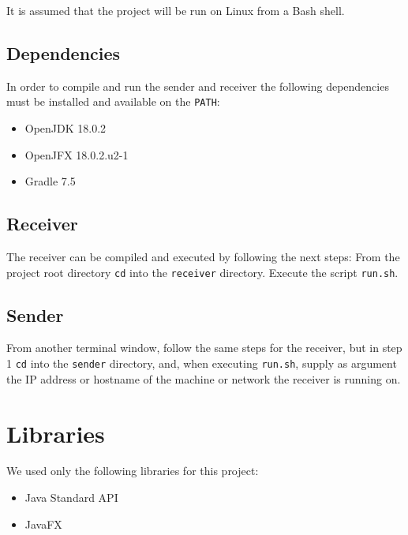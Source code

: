 \documentclass[10pt, a4paper]{article}
\begin{document}
It is assumed that the project will be run on Linux from a Bash shell.

\subsection{Dependencies}
\label{subsec:deps}

In order to compile and run the sender and receiver the following dependencies
must be installed and available on the \texttt{PATH}:
\begin{itemize}
  \item OpenJDK 18.0.2
  \item OpenJFX 18.0.2.u2-1
  \item Gradle 7.5
\end{itemize}

\subsection{Receiver}
\label{subsec:deps-receiver}

The receiver can be compiled and executed by following the next steps:
From the project root directory \texttt{cd} into the \texttt{receiver} directory.
Execute the script \texttt{run.sh}.

\subsection{Sender}
\label{subsec:deps-sender}

From another terminal window, follow the same steps for the receiver, but in
step 1 \texttt{cd} into the \texttt{sender} directory, and, when executing
\texttt{run.sh}, supply as argument the IP address or hostname of the machine or
network the receiver is running on.


\section{Libraries}
\label{sec:libs}

We used only the following libraries for this project:
\begin{itemize}
  \item Java Standard API
  \item JavaFX
\end{itemize}
\end{document}
